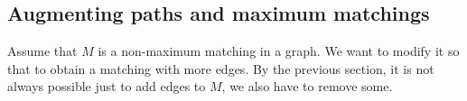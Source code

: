 

\setcounter{section}{4}
\setcounter{subsection}{2}
\setcounter{dfn}{2}

\subsection{Augmenting paths and maximum matchings}
Assume that $M$ is a non-maximum matching in a graph.
We want to modify it so that to obtain a matching with more edges.
By the previous section, it is not always possible just to add edges to $M$, we also have to remove some.


